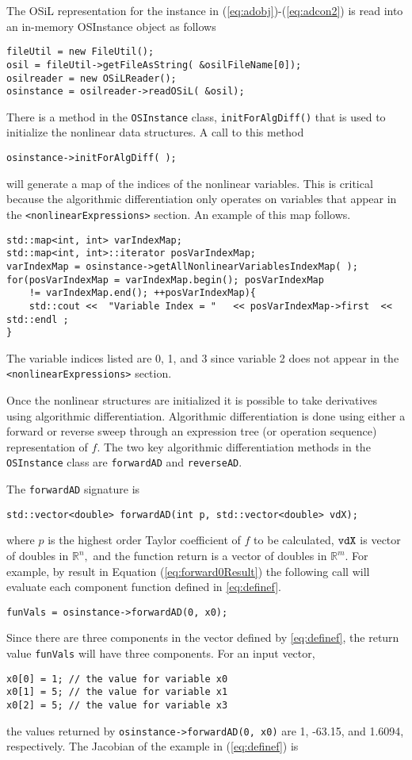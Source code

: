 \documentclass[11pt]{article}
\renewcommand{\_}{{\char"5F}}
\renewcommand{\{}{{\char"7B}}
\renewcommand{\}}{{\char"7D}}
\renewcommand{\^}{{\char"0D}}
\renewcommand{\'}{{\char"0D}}
\begin{document}
The OSiL representation for the instance  in  (\ref{eq:adobj})-(\ref{eq:adcon2})  is read into an in-memory OSInstance object as follows
\begin{verbatim}
fileUtil = new FileUtil();
osil = fileUtil->getFileAsString( &osilFileName[0]);
osilreader = new OSiLReader();
osinstance = osilreader->readOSiL( &osil);
\end{verbatim} 
There is a method in the {\tt OSInstance} class, {\tt initForAlgDiff()} that is used to initialize the nonlinear data structures.  A call to this method
\begin{verbatim}
osinstance->initForAlgDiff( );
\end{verbatim}  
will generate a map of the indices of the nonlinear variables. This is critical because the algorithmic differentiation only operates on variables that appear in the {\tt <nonlinearExpressions>} section.  An example of this map follows.
\begin{verbatim}
std::map<int, int> varIndexMap;
std::map<int, int>::iterator posVarIndexMap;
varIndexMap = osinstance->getAllNonlinearVariablesIndexMap( );
for(posVarIndexMap = varIndexMap.begin(); posVarIndexMap 
	!= varIndexMap.end(); ++posVarIndexMap){
	std::cout <<  "Variable Index = "   << posVarIndexMap->first  << std::endl ;
}
\end{verbatim}
The variable indices listed are 0, 1, and 3 since variable 2 does not appear in the {\tt <nonlinearExpressions>} section. 

Once the nonlinear structures are initialized it is possible to take derivatives using algorithmic differentiation.   Algorithmic differentiation is done using either a forward or reverse sweep through an expression tree (or operation sequence) representation of $f$.  The two key algorithmic differentiation methods in the {\tt OSInstance} class are {\tt forwardAD} and {\tt reverseAD}.   

The {\tt forwardAD} signature is
\begin{verbatim}
std::vector<double> forwardAD(int p, std::vector<double> vdX);
\end{verbatim}
where $p$ is the highest order Taylor coefficient of $f$ to be calculated,  $\tt vdX$ is vector of doubles in $ \mathbb{R}^{n},$ and the function return is a vector of doubles in $ \mathbb{R}^{m}.$  For example, by result in Equation (\ref{eq:forward0Result}) the following call will evaluate each component function defined in \ref{eq:definef}.
\begin{verbatim}
funVals = osinstance->forwardAD(0, x0);
\end{verbatim}
Since there are three components in the vector defined by  \ref{eq:definef}, the return value  {\tt funVals} will have three components. For an input vector, 
\begin{verbatim}
x0[0] = 1; // the value for variable x0
x0[1] = 5; // the value for variable x1
x0[2] = 5; // the value for variable x3
\end{verbatim}
the values returned by {\tt osinstance->forwardAD(0, x0)}  are 1, -63.15, and 1.6094, respectively.
The Jacobian of the example in (\ref{eq:definef}) is
\end{document}
